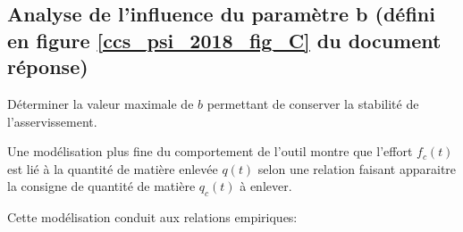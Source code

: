 %
%
%
%
%
%
%
%
%
%
%
%

\subsection{Analyse de l'influence du paramètre b (défini en figure \ref{ccs_psi_2018_fig_C} du document réponse)}
\begin{obj}
Déterminer la valeur maximale de $b$ permettant de conserver la stabilité de l'asservissement.
\end{obj}


\ifprof
\else

Une modélisation plus fine du comportement de l'outil montre que l'effort $f_{c}(t)$ est lié à la quantité de matière enlevée $q(t)$ selon une relation faisant apparaitre la consigne de quantité de matière $q_{c}(t)$ à enlever.

Cette modélisation conduit aux relations empiriques:


